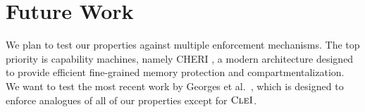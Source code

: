 \documentclass[10pt,conference]{ieeetran}%
\theoremstyle{definition}
\begin{document}



\section{Future Work}
\label{sec:future}

We plan to test our properties against multiple enforcement mechanisms.
The top priority is capability machines, namely
CHERI \cite{DBLP:conf/sp/WatsonWNMACDDGL15}, a modern architecture designed
to provide efficient fine-grained
memory protection and compartmentalization.
%
We want to test the most recent work by Georges et
al.~\cite{Georges22:TempsDesCerises}, which is designed
to enforce analogues of all of our properties except for \(\textnormal{\sc CleI}\).
\end{document}
